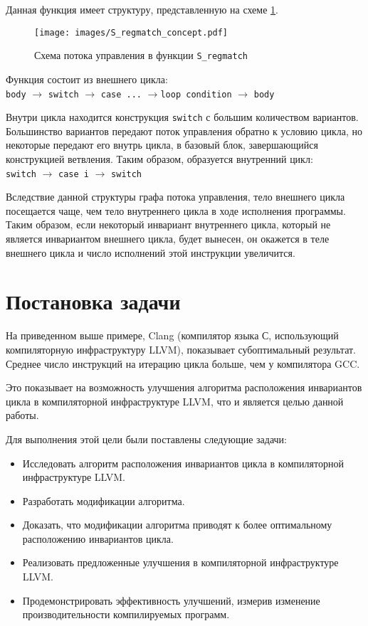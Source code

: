 Данная функция имеет структуру, представленную на схеме \ref{fig:S_regmatch_concept}.
\begin{figure}
    \centering
    \texttt{[image: images/S\_regmatch\_concept.pdf]}
    \caption{Схема потока управления в функции \texttt{S\_regmatch}}
    \label{fig:S_regmatch_concept}
\end{figure}

Функция состоит из внешнего цикла:
\\\texttt{body} $\rightarrow$ \texttt{switch} $\rightarrow$ \texttt{case ...} $\rightarrow$\texttt{loop condition} $\rightarrow$ \texttt{body}

Внутри цикла находится конструкция \texttt{switch} с большим количеством вариантов.
Большинство вариантов передают поток управления обратно к условию цикла, но некоторые передают его внутрь цикла, в базовый блок, завершающийся конструкцией ветвления.
Таким образом, образуется внутренний цикл:
\\\texttt{switch} $\rightarrow$ \texttt{case i} $\rightarrow$ \texttt{switch}

Вследствие данной структуры графа потока управления, тело внешнего цикла посещается чаще, чем тело внутреннего цикла в ходе исполнения программы.
Таким образом, если некоторый инвариант внутреннего цикла, который не является инвариантом внешнего цикла, будет вынесен, он окажется в теле внешнего цикла и число исполнений этой инструкции увеличится.

\section*{Постановка задачи}

На приведенном выше примере, Clang (компилятор языка С, использующий компиляторную инфраструктуру LLVM), показывает субоптимальный результат.
Среднее число инструкций на итерацию цикла больше, чем у компилятора GCC.

Это показывает на возможность улучшения алгоритма расположения инвариантов цикла в компиляторной инфраструктуре LLVM, что и является целью данной работы.

Для выполнения этой цели были поставлены следующие задачи:
\begin{itemize}
    \item Исследовать алгоритм расположения инвариантов цикла в компиляторной инфраструктуре LLVM.
    \item Разработать модификации алгоритма.
    \item Доказать, что модификации алгоритма приводят к более оптимальному расположению инвариантов цикла.
    \item Реализовать предложенные улучшения в компиляторной инфраструктуре LLVM.
    \item Продемонстрировать эффективность улучшений, измерив изменение производительности компилируемых программ.
\end{itemize}

\newpage

